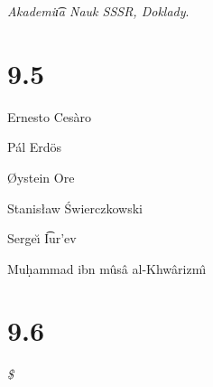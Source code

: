 \documentclass{article}
\begin{document}
{\sl Akademi\t \i a Nauk SSSR, Doklady}.


\section*{9.5}

Ernesto Ces\`aro

P\'al Erd\"os

\O ystein Ore

Stanis\l aw \'Swierczkowski

Serge\u\i {} \t Iur'ev

Mu\d hammad ibn m\^us\^a al-Khw\^arizm\^\i

\section*{9.6}

{\it \$}
\end{document}
